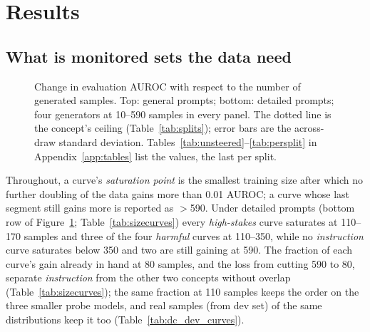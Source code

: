 \documentclass{article} %
\newcommand{\hs}{\emph{high-stakes}}
\newcommand{\harm}{\emph{harmful}}
\newcommand{\instr}{\emph{instruction}}
\begin{document}
\section{Results}
\label{sec:results}

\subsection{What is monitored sets the data need}
\label{sec:sizecurves}

\begin{figure}[t]
  \centering
  
  \caption{Change in evaluation AUROC with respect to the number of generated samples. Top: general prompts; bottom: detailed prompts; four generators at 10--590 samples in every panel. The dotted line is the concept's ceiling (Table~\ref{tab:splits}); error bars are the across-draw standard deviation. Tables~\ref{tab:unsteered}--\ref{tab:persplit} in Appendix~\ref{app:tables} list the values, the last per split.}
  \label{fig:sizecurves}
\end{figure}

Throughout, a curve's \emph{saturation point} is the smallest training size after which no further doubling of the data gains more than 0.01 AUROC; a curve whose last segment still gains more is reported as $>$590. Under detailed prompts (bottom row of Figure~\ref{fig:sizecurves}; Table~\ref{tab:sizecurves}) every \hs{} curve saturates at 110--170 samples and three of the four \harm{} curves at 110--350, while no \instr{} curve saturates below 350 and two are still gaining at 590. The fraction of each curve's gain already in hand at 80 samples, and the loss from cutting 590 to 80, separate \instr{} from the other two concepts without overlap (Table~\ref{tab:sizecurves}); the same fraction at 110 samples keeps the order on the three smaller probe models, and real samples (from dev set) of the same distributions keep it too (Table~\ref{tab:dc_dev_curves}).
\end{document}
